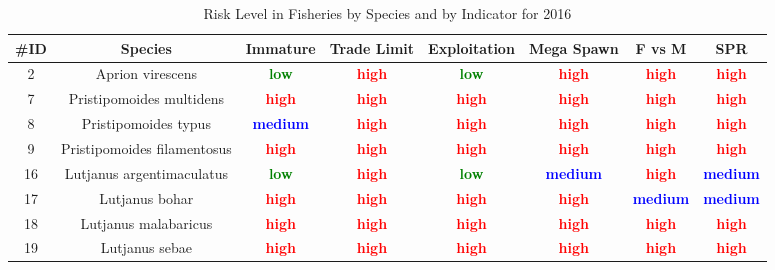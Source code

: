 \documentclass{report}\usepackage[]{graphicx}\usepackage[]{color}
\begin{document}
\begin{table}[ht]
\centering
\caption{Risk Level in Fisheries by Species and by Indicator for 2016} 
{\small
\begin{tabular}{cccccccc}
  \hline
\#ID & Species & Immature & Trade Limit & Exploitation & Mega Spawn & F vs M & SPR \\ 
  \hline
  2 & Aprion virescens & \textcolor{green}{\textbf{low}} & \textcolor{red}{\textbf{high}} & \textcolor{green}{\textbf{low}} & \textcolor{red}{\textbf{high}} & \textcolor{red}{\textbf{high}} & \textcolor{red}{\textbf{high}} \\ 
    7 & Pristipomoides multidens & \textcolor{red}{\textbf{high}} & \textcolor{red}{\textbf{high}} & \textcolor{red}{\textbf{high}} & \textcolor{red}{\textbf{high}} & \textcolor{red}{\textbf{high}} & \textcolor{red}{\textbf{high}} \\ 
    8 & Pristipomoides typus & \textcolor{blue}{\textbf{medium}} & \textcolor{red}{\textbf{high}} & \textcolor{red}{\textbf{high}} & \textcolor{red}{\textbf{high}} & \textcolor{red}{\textbf{high}} & \textcolor{red}{\textbf{high}} \\ 
    9 & Pristipomoides filamentosus & \textcolor{red}{\textbf{high}} & \textcolor{red}{\textbf{high}} & \textcolor{red}{\textbf{high}} & \textcolor{red}{\textbf{high}} & \textcolor{red}{\textbf{high}} & \textcolor{red}{\textbf{high}} \\ 
   16 & Lutjanus argentimaculatus & \textcolor{green}{\textbf{low}} & \textcolor{red}{\textbf{high}} & \textcolor{green}{\textbf{low}} & \textcolor{blue}{\textbf{medium}} & \textcolor{red}{\textbf{high}} & \textcolor{blue}{\textbf{medium}} \\ 
   17 & Lutjanus bohar & \textcolor{red}{\textbf{high}} & \textcolor{red}{\textbf{high}} & \textcolor{red}{\textbf{high}} & \textcolor{red}{\textbf{high}} & \textcolor{blue}{\textbf{medium}} & \textcolor{blue}{\textbf{medium}} \\ 
   18 & Lutjanus malabaricus & \textcolor{red}{\textbf{high}} & \textcolor{red}{\textbf{high}} & \textcolor{red}{\textbf{high}} & \textcolor{red}{\textbf{high}} & \textcolor{red}{\textbf{high}} & \textcolor{red}{\textbf{high}} \\ 
   19 & Lutjanus sebae & \textcolor{red}{\textbf{high}} & \textcolor{red}{\textbf{high}} & \textcolor{red}{\textbf{high}} & \textcolor{red}{\textbf{high}} & \textcolor{red}{\textbf{high}} & \textcolor{red}{\textbf{high}} \\ 

\end{tabular}}
\end{table}
\end{document}
